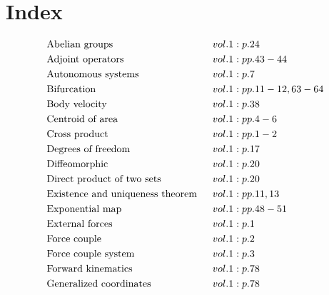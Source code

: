 \documentclass[a4paper]{article}
\begin{document}
 
\section*{Index} 
\allowdisplaybreaks 
\begin{align*} 
&\text{Abelian groups} \hspace{0.55556em}&& vol. 1: p. 24\\
&\text{Adjoint operators} \hspace{0.55556em}&& vol. 1: pp. 43-44\\
&\text{Autonomous systems} \hspace{0.55556em}&& vol. 1: p. 7\\
&\text{Bifurcation} \hspace{0.55556em}&& vol. 1: pp. 11-12, 63-64\\
&\text{Body velocity} \hspace{0.55556em}&& vol. 1: p. 38\\
&\text{Centroid of area} \hspace{0.55556em}&& vol. 1: pp. 4-6\\
&\text{Cross product} \hspace{0.55556em}&& vol. 1: pp. 1-2\\
&\text{Degrees of freedom} \hspace{0.55556em}&& vol. 1: p. 17\\
&\text{Diffeomorphic} \hspace{0.55556em}&& vol. 1: p. 20\\
&\text{Direct product of two sets} \hspace{0.55556em}&& vol. 1: p. 20\\
&\text{Existence and uniqueness theorem} \hspace{0.55556em}&& vol. 1: pp. 11, 13\\
&\text{Exponential map} \hspace{0.55556em}&& vol. 1: pp. 48-51\\
&\text{External forces} \hspace{0.55556em}&& vol. 1: p. 1\\
&\text{Force couple} \hspace{0.55556em}&& vol. 1: p. 2\\
&\text{Force couple system} \hspace{0.55556em}&& vol. 1: p. 3\\
&\text{Forward kinematics} \hspace{0.55556em}&& vol. 1: p. 78\\
&\text{Generalized coordinates} \hspace{0.55556em}&& vol. 1: p. 78\\

\end{align*}
\end{document}
